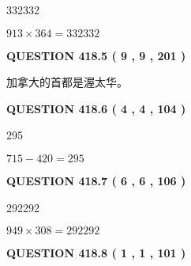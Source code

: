 \documentclass{ctexart}
\begin{document}
332332
 
 
 
 
\noindent{}

$ %
913 \times  %
364=   %
332332$
 
 
  
\vspace{0.2in}
  
{\textbf{\Large{QUESTION
418.5 
 ( 9 , 9 , 201 )
}}}
  
  
 
 
\noindent{}
 
 
加拿大的首都是渥太华。
 
 
 
 
  
\vspace{0.2in}
  
{\textbf{\Large{QUESTION
418.6 
 ( 4 , 4 , 104 )
}}}
  
  
 
 
\noindent{}

295
 
 
 
 
\noindent{}

$ %
715 -  %
420=   %
295$
 
 
  
\vspace{0.2in}
  
{\textbf{\Large{QUESTION
418.7 
 ( 6 , 6 , 106 )
}}}
  
  
 
 
\noindent{}

292292
 
 
 
 
\noindent{}

$ %
949 \times  %
308=   %
292292$
 
 
  
\vspace{0.2in}
  
{\textbf{\Large{QUESTION
418.8 
 ( 1 , 1 , 101 )
}}}
  
  
 
\end{document}
